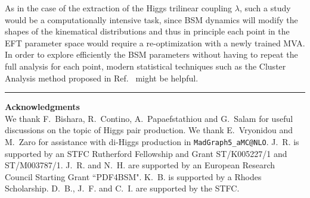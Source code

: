 As in the case of the extraction of the Higgs
trilinear coupling $\lambda$, such a study
would be a computationally intensive task, since
BSM dynamics will modify the shapes of the kinematical
distributions and thus in principle each point in the EFT parameter
space would require a re-optimization with a newly trained
MVA.
%
In order to explore efficiently the BSM parameters
without having to repeat the full analysis
for each point, modern statistical techniques
such as the Cluster Analysis method proposed
in Ref.~\cite{Dall'Osso:2015aia} might be helpful.



\bigskip
\bigskip
\begin{center}
\rule{5cm}{.1pt}
\end{center}
\bigskip
\bigskip

{\bf\noindent  Acknowledgments \\}
We thank F.~Bishara, R.~Contino, A.~Papaefstathiou and
G.~Salam for useful discussions on the topic
of Higgs pair production.
%
We thank E.~Vryonidou and M.~Zaro for
assistance with di-Higgs production
  in {\tt MadGraph5\_aMC@NLO}.
%
  J.~R. is supported by an STFC Rutherford Fellowship and
  Grant ST/K005227/1 and ST/M003787/1.
%
J.~R. and N.~H. are
supported by an European Research Council Starting Grant ``PDF4BSM".
%
K.~B. is supported by a Rhodes Scholarship.
%
D.~B., J.~F. and C.~I. are supported by the STFC.
